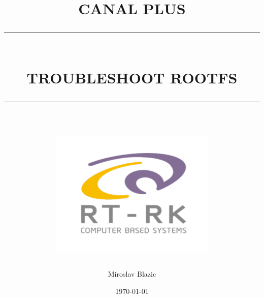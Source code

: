 \documentclass[12pt]{report}
\begin{document}
\newcommand{\HRule}[1]{\rule{\linewidth}{#1}}
\onehalfspacing


\pagestyle{fancy}
\fancyhf{}
\setlength\headheight{15pt}


\title{ \normalsize \textsc{CANAL PLUS}
\\ [1.0cm]
\HRule{0.5pt} \\
\LARGE \textbf{\uppercase{TROUBLESHOOT ROOTFS}}
\HRule{2pt} \\ [0.5cm]
\normalsize  \vspace*{5\baselineskip}
\includegraphics[scale=0.8]{logo_rtrk.png}
}



\author{Miroslav Blazic}
\date{\today\\
}

\maketitle


\newpage
\tableofcontents
\newpage
\end{document}
